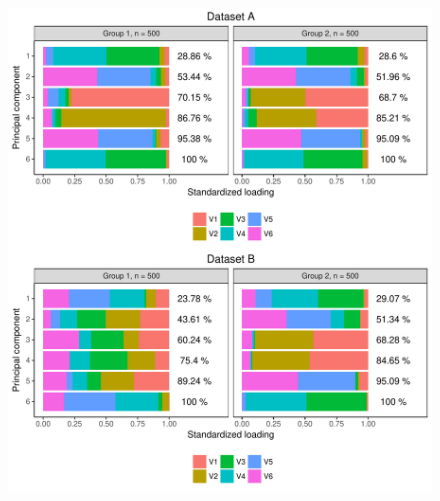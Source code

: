 \documentclass[]{interact}
\theoremstyle{plain}%
\theoremstyle{definition}
\theoremstyle{remark}
\begin{document}
\begin{figure}[H]
\center
\includegraphics[scale=0.8]{Figure4_PCADSC_v3.pdf}
\caption{}%
\label{plot.simChroma}
\end{figure}
\end{document}
